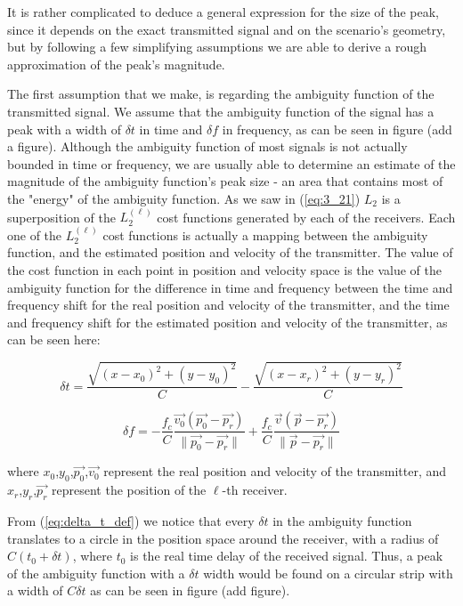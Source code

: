 It is rather complicated to deduce a general expression for the size of the peak, since it depends on the exact transmitted signal and on the scenario's geometry, but by following a few simplifying assumptions we are able to derive a rough approximation of the peak's magnitude.

The first assumption that we make, is regarding the ambiguity function of the transmitted signal. We assume that the ambiguity function of the signal has a peak with a width of $\delta t$ in time and $\delta f$ in frequency, as can be seen in figure (add a figure). Although the ambiguity function of most signals is not actually bounded in time or frequency, we are usually able to determine an estimate of the magnitude of the ambiguity function's peak size - an area that contains most of the "energy" of the ambiguity function. As we saw in (\ref{eq:3_21}) $L_2$ is a superposition of the $L_2^{(\ell)}$ cost functions generated by each of the receivers. Each one of the $L_2^{(\ell)}$ cost functions is actually a mapping between the ambiguity function, and the estimated position and velocity of the transmitter. The value of the cost function in each point in position and velocity space is the value of the ambiguity function for the difference in time and frequency between the time and frequency shift for the real position and velocity of the transmitter, and the time and frequency shift for the estimated position and velocity of the transmitter, as can be seen here:

\begin{equation}
\label{eq:delta_t_def}
\delta t = \frac{\sqrt{(x-x_0)^2+(y-y_0)^2}}{C}-\frac{\sqrt{(x-x_r)^2+(y-y_r)^2}}{C}
\end{equation}

\begin{equation}
\label{eq:delta_f_def}
\delta f = -\frac{f_c}{C} \frac{\vec{v_0} (\vec{p_0}-\vec{p_r})}{\|\vec{p_0}-\vec{p_r}\|}+
\frac{f_c}{C} \frac{\vec{v} (\vec{p}-\vec{p_r})}{\|\vec{p}-\vec{p_r}\|}
\end{equation}

where $x_0$,$y_0$,$\vec{p_0}$,$\vec{v_0}$ represent the real position and velocity of the transmitter, and $x_r$,$y_r$,$\vec{p_r}$ represent the position of the $\ell$-th receiver.

From (\ref{eq:delta_t_def}) we notice that every $\delta t$ in the ambiguity function translates to a circle in the position space around the receiver, with a radius of $C(t_0+\delta t)$, where $t_0$ is the real time delay of the received signal. 
Thus, a peak of the ambiguity function with a $\delta t$ width would be found on a circular strip with a width of $C\delta t$ as can be seen in figure (add figure).


